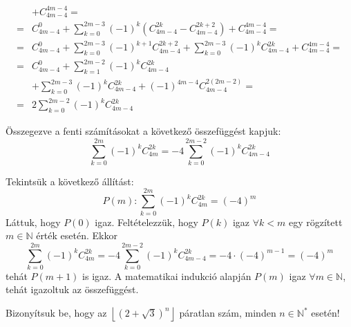 \begin{solution}
\begin{align*}
 & +C_{4m-4}^{4m-4}=\\
= & C_{4m-4}^{0}+\sum_{k=0}^{2m-3}(-1)^{k}\left(C_{4m-4}^{2k}-C_{4m-4}^{2k+2}\right)+C_{4m-4}^{4m-4}=\\
= & C_{4m-4}^{0}+\sum_{k=0}^{2m-3}(-1)^{k+1}C_{4m-4}^{2k+2}+\sum_{k=0}^{2m-3}(-1)^{k}C_{4m-4}^{2k}+C_{4m-4}^{4m-4}=\\
= & C_{4m-4}^{0}+\sum_{k=1}^{2m-2}(-1)^{k}C_{4m-4}^{2k}\\
 & +\sum_{k=0}^{2m-3}(-1)^{k}C_{4m-4}^{2k}+(-1)^{4m-4}C_{4m-4}^{2(2m-2)}=\\
= & 2\sum_{k=0}^{2m-2}(-1)^{k}C_{4m-4}^{2k}
\end{align*}

Összegezve a fenti számításokat a következő összefüggést kapjuk: 
\[
\sum_{k=0}^{2m}(-1)^{k}C_{4m}^{2k}=-4\sum_{k=0}^{2m-2}(-1)^{k}C_{4m-4}^{2k}
\]

Tekintsük a következő állítást: 
\[
P(m):\sum_{k=0}^{2m}(-1)^{k}C_{4m}^{2k}=(-4)^{m}
\]
Láttuk, hogy $P(0)$ igaz. Feltételezzük, hogy $P(k)$ igaz $\forall k<m$
egy rögzített $m\in\mathbb{N}$ érték esetén. Ekkor 
\[
\sum_{k=0}^{2m}(-1)^{k}C_{4m}^{2k}=-4\sum_{k=0}^{2m-2}(-1)^{k}C_{4m-4}^{2k}=-4\cdot(-4)^{m-1}=(-4)^{m}
\]
tehát $P(m+1)$ is igaz. A matematikai indukció alapján $P(m)$ igaz
$\forall m\in\mathbb{N}$, tehát igazoltuk az összefüggést. 
\end{solution}
\begin{extraproblem}
Bizonyítsuk be, hogy az $\left\lfloor (2+\sqrt{3})^{n}\right\rfloor $
páratlan szám, minden $n\in\mathbb{N}^{*}$ esetén!
\end{extraproblem}

